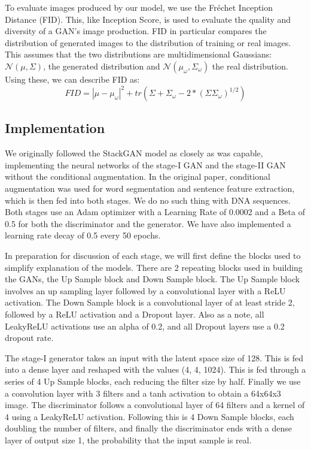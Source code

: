 \documentclass{article}
\begin{document}
	To evaluate images produced by our model, we use the Fréchet Inception Distance (FID). This, like Inception Score, is used to evaluate the quality and diversity of a GAN’s image production. FID in particular compares the distribution of generated images to the distribution of training or real images. This assumes that the two distributions are multidimensional Gaussians: $\mathcal{N}(\mu, \Sigma)$, the generated distribution and $\mathcal{N}(\mu_{\omega}, \Sigma_{\omega})$ the real distribution. Using these, we can describe FID as:
	\begin{equation}
		FID = |\mu-\mu_{\omega}|^{2} + tr(\Sigma + \Sigma_{\omega} - 2*(\Sigma\Sigma_{\omega})^{1/2})
	\end{equation}

	\subsection{Implementation}
	We originally followed the StackGAN model as closely as was capable, implementing the neural networks of the stage-I GAN and the stage-II GAN without the conditional augmentation. In the original paper, conditional augmentation was used for word segmentation and sentence feature extraction, which is then fed into both stages. We do no such thing with DNA sequences. Both stages use an Adam optimizer with a Learning Rate of 0.0002 and a Beta of 0.5 for both the discriminator and the generator. We have also implemented a learning rate decay of 0.5 every 50 epochs.

	In preparation for discussion of each stage, we will first define the blocks used to simplify explanation of the models. There are 2 repeating blocks used in building the GANs, the Up Sample block and Down Sample block. The Up Sample block involves an up sampling layer followed by a convolutional layer with a ReLU activation. The Down Sample block is a convolutional layer of at least stride 2, followed by a ReLU activation and a Dropout layer. Also as a note, all LeakyReLU activations use an alpha of 0.2, and all Dropout layers use a 0.2 dropout rate.

	The stage-I generator takes an input with the latent space size of 128. This is fed into a dense layer and reshaped with the values (4, 4, 1024). This is fed through a series of 4 Up Sample blocks, each reducing the filter size by half. Finally we use a convolution layer with 3 filters and a tanh activation to obtain a 64x64x3 image. The discriminator follows a convolutional layer of 64 filters and a kernel of 4 using a LeakyReLU activation. Following this is 4 Down Sample blocks, each doubling the number of filters, and finally the discriminator ends with a dense layer of output size 1, the probability that the input sample is real.
\end{document}
